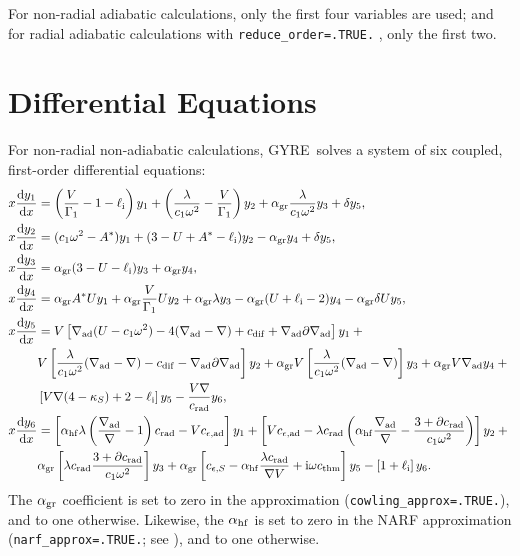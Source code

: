 \documentclass[fleqn]{article}
\newcommand{\gyre}{GYRE}
\newcommand{\diff}{\mathrm{d}}
\newcommand{\ii}{\mathrm{i}}
\newcommand{\elli}{\ell_{\rm i}}
\newcommand{\Vg}{\frac{V}{\Gamma_{1}}}
\newcommand{\As}{A^{\ast}}
\newcommand{\nabad}{\nabla_{\rm ad}}
\newcommand{\dnabad}{\partial\nabad}
\newcommand{\kapS}{\kappa_{S}}
\newcommand{\crad}{c_{\rm rad}}
\newcommand{\dcrad}{\partial\crad}
\newcommand{\cepsad}{c_{\epsilon,{\rm ad}}}
\newcommand{\cepsS}{c_{\epsilon,S}}
\newcommand{\cthm}{c_{\rm thm}}
\newcommand{\cdif}{c_{\rm dif}}
\newcommand{\agr}{\alpha_{\rm gr}}
\newcommand{\ahf}{\alpha_{\rm hf}}
\begin{document}
For non-radial adiabatic calculations, only the first four variables
are used; and for radial adiabatic calculations with
\texttt{reduce\_order=.TRUE.} , only the first two.


\section*{Differential Equations}

For non-radial non-adiabatic calculations, \gyre\ solves a system of
six coupled, first-order differential equations:
\begin{align*}
x \frac{\diff y_{1}}{\diff x} &=
\left(\Vg - 1 - \elli \right) y_{1} +
\left(\frac{\lambda}{c_{1} \omega^{2}} - \Vg \right) y_{2} +
\agr \frac{\lambda}{c_{1} \omega^{2}} y_{3} +
\delta y_{5}, \\
x \frac{\diff y_{2}}{\diff x} &=
(c_{1} \omega^{2} - \As ) y_{1} +
(3 - U + \As - \elli) y_{2} -
\agr y_{4} +
\delta y_{5}, \\
x \frac{\diff y_{3}}{\diff x} &=
\agr (3 - U - \elli) y_{3} +
\agr y_{4}, \\
x \frac{\diff y_{4}}{\diff x} &=
\agr \As U y_{1} +
\agr \Vg U y_{2} +
\agr \lambda y_{3} -
\agr (U + \elli - 2) y_{4}
- \agr \delta U y_{5}, \\
x \frac{\diff y_{5}}{\diff x} &=
V \left[ \nabad (U - c_{1}\omega^{2}) - 4 (\nabad - \nabla) + \cdif + \nabad \dnabad \right] y_{1} + \mbox{} \\
&
V \left[ \frac{\lambda}{c_{1} \omega^{2}} (\nabad - \nabla) - \cdif - \nabad \dnabad \right] y_{2} +
\agr V \left[ \frac{\lambda}{c_{1} \omega^{2}} (\nabad - \nabla) \right] y_{3} + \agr V \nabad y_{4} + \mbox{} \\
& 
\left[ V \nabla (4 - \kapS) + 2 - \elli \right] y_{5} -
\frac{V \nabla}{\crad} y_{6}, \\
x \frac{\diff y_{6}}{\diff x} &=
\left[ \ahf \lambda\left( \frac{\nabad}{\nabla} - 1 \right) \crad - V \cepsad \right] y_{1} +
\left[ V \cepsad - \lambda \crad \left( \ahf \frac{\nabad}{\nabla} - \frac{3 + \dcrad}{c_{1}\omega^{2}} \right) \right] y_{2} + \mbox{} \\
&
\agr \left[ \lambda \crad \frac{3 + \dcrad}{c_{1}\omega^{2}} \right] y_{3} +
\agr \left[ \cepsS - \ahf \frac{\lambda\crad}{\nabla V} + \ii \omega \cthm\right] y_{5} -
\left[ 1 + \elli \right] y_{6}.
\end{align*}
The $\agr$ coefficient is set to zero in the \citet{Cowling:1941aa}
approximation (\texttt{cowling\_approx=.TRUE.}), and to one
otherwise. Likewise, the $\ahf$ is set to zero in the NARF
approximation (\texttt{narf\_approx=.TRUE.}; see
  \citealp{Townsend:2005ab}), and to one otherwise.
\end{document}
